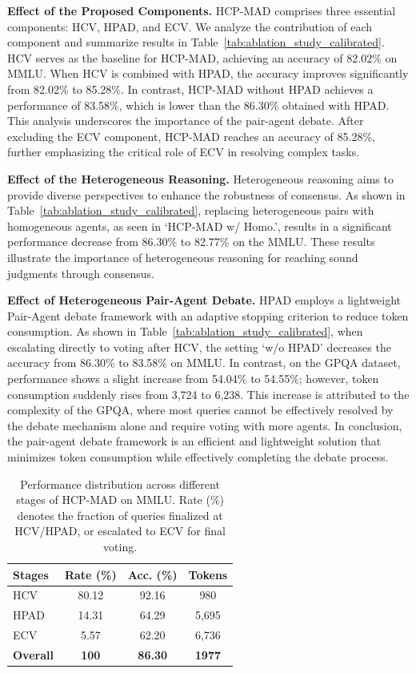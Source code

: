 \documentclass[11pt]{article}
\begin{document}
\noindent\textbf{Effect of the Proposed Components.} 
HCP-MAD comprises three essential components: HCV, HPAD, and ECV. We analyze the contribution of each component and summarize results in Table~\ref{tab:ablation_study_calibrated}.
HCV serves as the baseline for HCP-MAD, achieving an accuracy of 82.02\% on MMLU. When HCV is combined with HPAD, the accuracy improves significantly from 82.02\% to 85.28\%. 
In contrast, HCP-MAD without HPAD achieves a performance of 83.58\%, which is lower than the 86.30\% obtained with HPAD.
This analysis underscores the importance of the pair-agent debate. 
After excluding the ECV component, HCP-MAD reaches an accuracy of 85.28\%, further emphasizing the critical role of ECV in resolving complex tasks.

\noindent\textbf{Effect of the Heterogeneous Reasoning.} 
Heterogeneous reasoning aims to provide diverse perspectives to enhance the robustness of consensus. 
As shown in Table~\ref{tab:ablation_study_calibrated}, replacing heterogeneous pairs with homogeneous agents, as seen in `HCP-MAD w/ Homo.', results in a significant performance decrease from 86.30\% to 82.77\% on the MMLU. 
These results illustrate the importance of heterogeneous reasoning for reaching sound judgments through consensus.


\noindent\textbf{Effect of Heterogeneous Pair-Agent Debate.}
HPAD employs a lightweight Pair-Agent debate framework with an adaptive stopping criterion to reduce token consumption. 
As shown in Table~\ref{tab:ablation_study_calibrated}, when escalating directly to voting after HCV, the setting  `w/o HPAD' decreases the accuracy from 86.30\% to 83.58\% on MMLU. 
In contrast, on the GPQA dataset, performance shows a slight increase from 54.04\% to 54.55\%; however, token consumption suddenly rises from 3,724 to 6,238. 
This increase is attributed to the complexity of the GPQA, where most queries cannot be effectively resolved by the debate mechanism alone and require voting with more agents. 
In conclusion, the pair-agent debate framework is an efficient and lightweight solution that minimizes token consumption while effectively completing the debate process.

\begin{table}[!t]
\centering
\fontsize{9pt}{9.5pt}\selectfont
\caption{Performance distribution across different stages of HCP-MAD on  MMLU. Rate (\%) denotes the fraction of queries finalized at HCV/HPAD, or escalated to ECV for final voting.}
\label{tab:stage_analysis}
\begin{tabular}{l|ccc}
\toprule
\textbf{Stages} & \textbf{Rate (\%)} & \textbf{Acc. (\%)} & \textbf{Tokens} \\
\midrule
HCV & 80.12 & 92.16 & 980 \\
HPAD & 14.31 & 64.29 & 5,695 \\
ECV & 5.57 & 62.20 & 6,736 \\
\midrule
\textbf{Overall} & \textbf{100} & \textbf{86.30} & \textbf{1977} \\
\bottomrule
\end{tabular}
\vspace{-1.3em}
\end{table}
\end{document}
